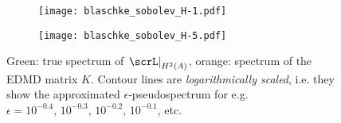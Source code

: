 \begin{figure}
    \centering
    \begin{subfigure}{0.45\textwidth}
        \centering
        \texttt{[image: blaschke\_sobolev\_H-1.pdf]}
    \end{subfigure}
    \hfill
    \begin{subfigure}{0.45\textwidth}
        \centering
        \texttt{[image: blaschke\_sobolev\_H-5.pdf]}
    \end{subfigure}
    \caption{
        Green: true spectrum of $\left. \scrL \right|_{H^2(A)}$, 
        orange: spectrum of the EDMD matrix $K$. Contour lines are 
        \emph{logarithmically scaled}, i.e. they show the approximated 
        $\epsilon$-pseudospectrum for e.g. 
        $\epsilon = 10^{-0.4},\, 10^{-0.3},\, 10^{-0.2},\, 10^{-0.1}$, etc. 
    }\label{fig:blaschke_sobolev}
\end{figure}


